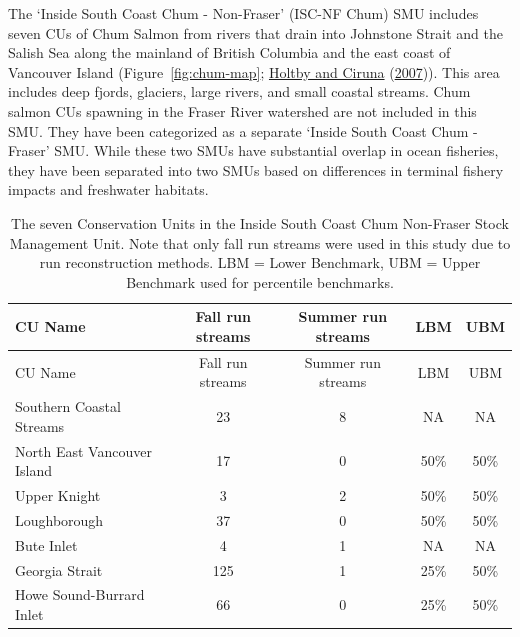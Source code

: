 \documentclass[11pt]{book}
\begin{document}
The `Inside South Coast Chum - Non-Fraser' (ISC-NF Chum) SMU includes seven CUs of Chum Salmon from rivers that drain into Johnstone Strait and the Salish Sea along the mainland of British Columbia and the east coast of Vancouver Island (Figure~\ref{fig:chum-map}; \protect\hyperlink{ref-holtbyConservationUnitsPacific2007}{Holtby and Ciruna} (\protect\hyperlink{ref-holtbyConservationUnitsPacific2007}{2007})). This area includes deep fjords, glaciers, large rivers, and small coastal streams. Chum salmon CUs spawning in the Fraser River watershed are not included in this SMU. They have been categorized as a separate `Inside South Coast Chum - Fraser' SMU. While these two SMUs have substantial overlap in ocean fisheries, they have been separated into two SMUs based on differences in terminal fishery impacts and freshwater habitats.
\begin{longtable}[]{@{}lcccc@{}}
\caption{\label{tab:CU-summary}The seven Conservation Units in the Inside South Coast Chum Non-Fraser Stock Management Unit. Note that only fall run streams were used in this study due to run reconstruction methods. LBM = Lower Benchmark, UBM = Upper Benchmark used for percentile benchmarks.}\tabularnewline
\toprule
CU Name & Fall run streams & Summer run streams & LBM & UBM \\
\midrule
\endfirsthead
\toprule
CU Name & Fall run streams & Summer run streams & LBM & UBM \\
\midrule
\endhead
Southern Coastal Streams & 23 & 8 & NA & NA \\
North East Vancouver Island & 17 & 0 & 50\% & 50\% \\
Upper Knight & 3 & 2 & 50\% & 50\% \\
Loughborough & 37 & 0 & 50\% & 50\% \\
Bute Inlet & 4 & 1 & NA & NA \\
Georgia Strait & 125 & 1 & 25\% & 50\% \\
Howe Sound-Burrard Inlet & 66 & 0 & 25\% & 50\% \\
\bottomrule
\end{longtable}
\end{document}

